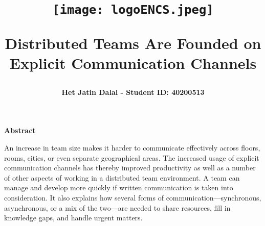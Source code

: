 \documentclass{llncs}
\renewenvironment{abstract}{%
  \begin{center}%
    {\large\bfseries Abstract}%
  \end{center}%
  \quotation
}{%
  \endquotation
}
\begin{document}
%

\title{

\begin{figure}[ht]
    \centering
    \texttt{[image: logoENCS.jpeg]}
    \label{fig:example}
\end{figure}

Distributed Teams Are Founded on Explicit
Communication Channels\vspace{30pt}}
%
%

\author{\large \textbf{Het Jatin Dalal - Student ID: 40200513}\vspace{20pt}}
%
%

{\def\addcontentsline#1#2#3{}\maketitle}

\newpage
\begin{abstract}
\large An increase in team size makes it harder to communicate effectively across floors, rooms, cities, or even separate geographical areas. The increased usage of explicit communication channels has thereby improved productivity as well as a number of other aspects of working in a distributed team environment. A team can manage and develop more quickly if written communication is taken into consideration. It also explains how several forms of communication—synchronous, asynchronous, or a mix of the two—are needed to share resources, fill in knowledge gaps, and handle urgent matters. 

\end{abstract}
%
%
%
\tableofcontents
\newpage


\end{document}

